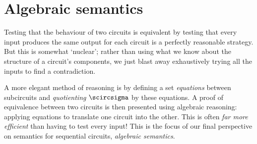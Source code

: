 \chapter{Algebraic semantics}

Testing that the behaviour of two circuits is equivalent by testing that every
input produces the same output for each circuit is a perfectly reasonable
strategy.
But this is somewhat `nuclear'; rather than using what we know
about the structure of a circuit's components, we just blast away
exhaustively trying all the inputs to find a contradiction.

A more elegant method of reasoning is by defining a set \emph{equations} between
subcircuits and \emph{quotienting} \(\scircsigma\) by these equations.
A proof of equivalence between two circuits is then presented using algebraic
reasoning: applying equations to translate one circuit into the other.
This is often \emph{far more efficient} than having to test every input!
This is the focus of our final perspective on semantics for sequential
circuits, \emph{algebraic semantics}.

